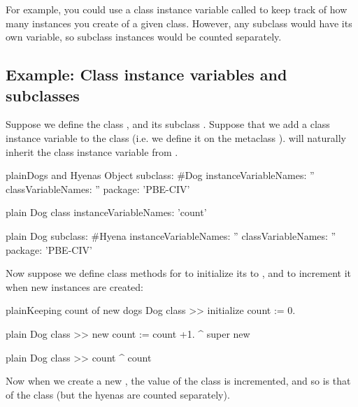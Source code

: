 \documentclass[10pt,twoside,english]{_support/latex/sbabook/sbabook}
\begin{document}
For example, you could use a class instance variable called  to keep
track of how many instances you create of a given class. However, any subclass
would have its own  variable, so subclass instances would be counted
separately.
\subsection{Example: Class instance variables and subclasses}
Suppose we define the class , and its subclass . Suppose that we
add a  class instance variable to the class  (i.e. we define it
on the metaclass ).  will naturally inherit the class
instance variable  from .

\begin{listing}[float]{plain}{Dogs and Hyenas}
Object subclass: #Dog
    instanceVariableNames: ''
    classVariableNames: ''
    package: 'PBE-CIV'
\end{listing}

\begin{displaycode}{plain}
Dog class
    instanceVariableNames: 'count'
\end{displaycode}

\begin{displaycode}{plain}
Dog subclass: #Hyena
    instanceVariableNames: ''
    classVariableNames: ''
    package: 'PBE-CIV'
\end{displaycode}

Now suppose we define class methods for  to initialize its  to
, and to increment it when new instances are created:

\begin{listing}[float, label=scr:dogCount]{plain}{Keeping count of new dogs}
Dog class >> initialize
    count := 0.
\end{listing}

\begin{displaycode}{plain}
Dog class >> new
    count := count +1.
    ^ super new
\end{displaycode}

\begin{displaycode}{plain}
Dog class >> count
    ^ count
\end{displaycode}

Now when we create a new , the  value of the class  is
incremented, and so is that of the class  (but the hyenas are counted
separately).
\end{document}
